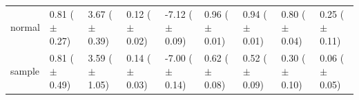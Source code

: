 \begin{tabular}{lllllllll}
normal & \makecell{0.81 \\ ($\pm$ 0.27)} & \makecell{3.67 \\ ($\pm$ 0.39)} & \makecell{0.12 \\ ($\pm$ 0.02)} & \makecell{-7.12 \\ ($\pm$ 0.09)} & \makecell{0.96 \\ ($\pm$ 0.01)} & \makecell{0.94 \\ ($\pm$ 0.01)} & \makecell{0.80 \\ ($\pm$ 0.04)} & \makecell{0.25 \\ ($\pm$ 0.11)} \\
sample & \makecell{0.81 \\ ($\pm$ 0.49)} & \makecell{3.59 \\ ($\pm$ 1.05)} & \makecell{0.14 \\ ($\pm$ 0.03)} & \makecell{-7.00 \\ ($\pm$ 0.14)} & \makecell{0.62 \\ ($\pm$ 0.08)} & \makecell{0.52 \\ ($\pm$ 0.09)} & \makecell{0.30 \\ ($\pm$ 0.10)} & \makecell{0.06 \\ ($\pm$ 0.05)} \\
\bottomrule
\end{tabular}
